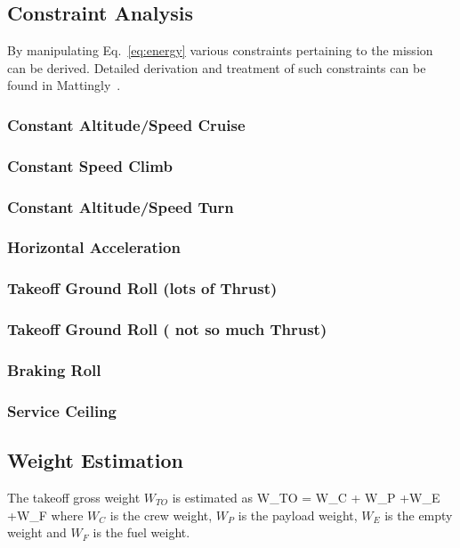 \documentclass[pdftex,11pt,letter]{article}
\begin{document}
\subsection{Constraint Analysis}
By manipulating Eq.~\ref{eq:energy} various constraints pertaining to the mission can be derived. Detailed derivation and treatment of such constraints can be found in Mattingly~\etal\cite{MattinglyText}.

\subsubsection{Constant Altitude/Speed Cruise}

\subsubsection{Constant Speed Climb}

\subsubsection{Constant Altitude/Speed Turn}

\subsubsection{Horizontal Acceleration}

\subsubsection{Takeoff Ground Roll (lots of Thrust)}

\subsubsection{Takeoff Ground Roll ( not so much Thrust)}

\subsubsection{Braking Roll}

\subsubsection{Service Ceiling}

\subsection{Weight Estimation}
The  takeoff gross weight $W_{TO}$ is estimated as
\beq\label{eq:takeoff_weight}
W_{TO} = W_C + W_P +W_E +W_F
\eeq
where $W_C$ is the crew weight, $W_P$ is the payload weight, $W_E$ is the empty weight and $W_F$ is the fuel weight.
\end{document}
